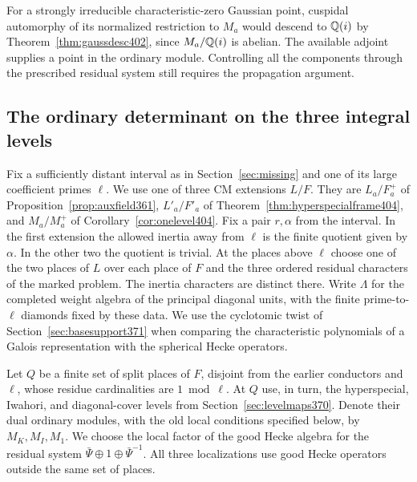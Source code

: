 \documentclass[a4paper,11pt]{article}
\theoremstyle{definition}
\theoremstyle{remark}
\numberwithin{equation}{section}
\begin{document}
For a strongly irreducible characteristic-zero Gaussian point,
cuspidal automorphy of its normalized restriction to \(M_a\)
would descend to \(\mathbb Q(i)\) by Theorem~\ref{thm:gaussdesc402},
since \(M_a/\mathbb Q(i)\) is abelian. The available adjoint supplies
a point in the ordinary module. Controlling all the components
through the prescribed residual system still requires the
propagation argument.


\subsection{The ordinary determinant on the three integral levels}
\label{sec:typeaction405}

Fix a sufficiently distant interval as in Section~\ref{sec:missing}
and one of its large coefficient primes \(\ell\). We use one of three
CM extensions \(L/F\). They are \(L_a/F_a^+\) of
Proposition~\ref{prop:auxfield361}, \(L'_a/F'_a\) of
Theorem~\ref{thm:hyperspecialframe404}, and \(M_a/M_a^+\) of
Corollary~\ref{cor:onelevel404}. Fix a pair \(r,\alpha\) from
the interval. In the first extension the allowed inertia away
from \(\ell\) is the finite quotient given by \(\alpha\). In the
other two the quotient is trivial. At the places above \(\ell\)
choose one of the two places of \(L\) over each place of \(F\)
and the three ordered residual characters of the marked problem.
The inertia characters are distinct there. Write \(\Lambda\) for
the completed weight algebra of the principal diagonal units,
with the finite prime-to-\(\ell\) diamonds fixed by these data.
We use the cyclotomic twist of Section~\ref{sec:basesupport371}
when comparing the characteristic polynomials of a Galois
representation with the spherical Hecke operators.

Let \(Q\) be a finite set of split places of \(F\), disjoint from
the earlier conductors and \(\ell\), whose residue cardinalities
are \(1\bmod\ell\). At \(Q\) use, in turn, the hyperspecial,
Iwahori, and diagonal-cover levels from
Section~\ref{sec:levelmaps370}. Denote their dual ordinary
modules, with the old local conditions specified below, by
\(M_K,M_I,M_1\). We choose the local factor of the good Hecke
algebra for the residual system
\(\bar\Psi\oplus1\oplus\bar\Psi^{-1}\). All three localizations
use good Hecke operators outside the same set of places.
\end{document}
